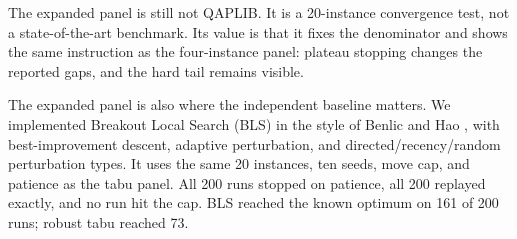 \documentclass[pdflatex,sn-mathphys-num]{sn-jnl}
\begin{document}
The expanded panel is still not QAPLIB. It is a 20-instance convergence test, not a state-of-the-art
benchmark. Its value is that it fixes the denominator and shows the same instruction as the
four-instance panel: plateau stopping changes the reported gaps, and the hard tail remains visible.

The expanded panel is also where the independent baseline matters. We implemented Breakout Local
Search (BLS) in the style of Benlic and Hao \citep{benlic2013}, with best-improvement descent,
adaptive perturbation, and directed/recency/random perturbation types. It uses the same 20
instances, ten seeds, move cap, and patience as the tabu panel. All 200 runs stopped on patience,
all 200 replayed exactly, and no run hit the cap. BLS reached the known optimum on 161 of 200 runs;
robust tabu reached 73.
\end{document}
